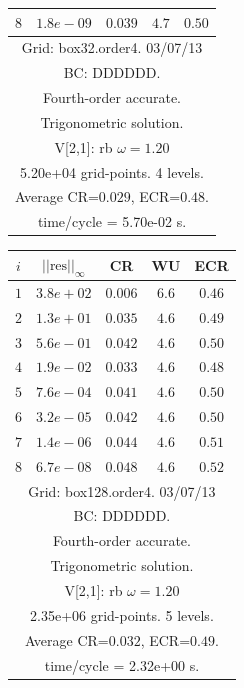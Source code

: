 \begin{table}[hbt]
\begin{center}
\begin{tabular}{|c|c|c|c|c|}
 $ 8$  & $ 1.8e-09$ & $0.039$ & $ 4.7$ & $0.50$ \\ 
\hline 
\multicolumn{5}{|c|}{Grid: box32.order4. 03/07/13}  \\
\multicolumn{5}{|c|}{BC: DDDDDD.}  \\
\multicolumn{5}{|c|}{Fourth-order accurate.}  \\
\multicolumn{5}{|c|}{Trigonometric solution.}  \\
\multicolumn{5}{|c|}{V[2,1]: rb $\omega=1.20$}  \\
\multicolumn{5}{|c|}{5.20e+04 grid-points. 4 levels.}  \\
\multicolumn{5}{|c|}{Average CR=$0.029$, ECR=$0.48$.}  \\
\multicolumn{5}{|c|}{time/cycle = 5.70e-02 s.}  \\
\hline 
\end{tabular}
\begin{tabular}{|c|c|c|c|c|} \hline 
 $i$   & $\vert\vert\mbox{res}\vert\vert_\infty$  &  CR     &  WU    & ECR  \\   \hline 
 $ 1$  & $ 3.8e+02$ & $0.006$ & $ 6.6$ & $0.46$ \\ 
 $ 2$  & $ 1.3e+01$ & $0.035$ & $ 4.6$ & $0.49$ \\ 
 $ 3$  & $ 5.6e-01$ & $0.042$ & $ 4.6$ & $0.50$ \\ 
 $ 4$  & $ 1.9e-02$ & $0.033$ & $ 4.6$ & $0.48$ \\ 
 $ 5$  & $ 7.6e-04$ & $0.041$ & $ 4.6$ & $0.50$ \\ 
 $ 6$  & $ 3.2e-05$ & $0.042$ & $ 4.6$ & $0.50$ \\ 
 $ 7$  & $ 1.4e-06$ & $0.044$ & $ 4.6$ & $0.51$ \\ 
 $ 8$  & $ 6.7e-08$ & $0.048$ & $ 4.6$ & $0.52$ \\ 
\hline 
\multicolumn{5}{|c|}{Grid: box128.order4. 03/07/13}  \\
\multicolumn{5}{|c|}{BC: DDDDDD.}  \\
\multicolumn{5}{|c|}{Fourth-order accurate.}  \\
\multicolumn{5}{|c|}{Trigonometric solution.}  \\
\multicolumn{5}{|c|}{V[2,1]: rb $\omega=1.20$}  \\
\multicolumn{5}{|c|}{2.35e+06 grid-points. 5 levels.}  \\
\multicolumn{5}{|c|}{Average CR=$0.032$, ECR=$0.49$.}  \\
\multicolumn{5}{|c|}{time/cycle = 2.32e+00 s.}  \\
\hline 
\end{tabular}

\end{center}
\end{table}
